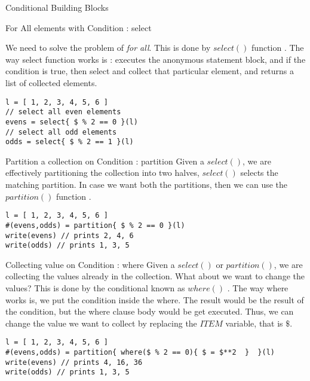 \begin{section}{Conditional Building Blocks}
\begin{subsection}{For All elements with Condition : select }

We need to solve the problem of \emph{for all}. This is done by $select()$ function .
The way select function works is : executes the anonymous statement block, and if the condition is true, 
then select and collect that particular element, and returns a list of collected elements.

\begin{lstlisting}[style=JexlStyle]
l = [ 1, 2, 3, 4, 5, 6 ]
// select all even elements 
evens = select{ $ % 2 == 0 }(l)
// select all odd elements 
odds = select{ $ % 2 == 1 }(l) 
\end{lstlisting}

\end{subsection}

\begin{subsection}{Partition a collection on Condition : partition }
Given a $select()$, we are effectively partitioning the collection into two halves,
$select()$ selects the matching partition. In case we want both the partitions, then 
we can use the $partition()$ function .

\begin{center}\begin{minipage}{\linewidth}
\begin{lstlisting}[style=JexlStyle]
l = [ 1, 2, 3, 4, 5, 6 ]
#(evens,odds) = partition{ $ % 2 == 0 }(l)
write(evens) // prints 2, 4, 6 
write(odds) // prints 1, 3, 5
\end{lstlisting}\end{minipage}
\end{center}

\end{subsection}

\begin{subsection}{Collecting value on Condition : where }
Given a $select()$ or $partition()$, we are collecting the values already 
in the collection. What about we want to change the values? 
This is done by the conditional known as $where()$ .
The way where works is, we put the condition inside the where.
The result would be the result of the condition, but the where clause body 
would be get executed. Thus, we can change the value we want to collect
by replacing the $ITEM$ variable, that is $\$$.

\begin{center}\begin{minipage}{\linewidth}
\begin{lstlisting}[style=JexlStyle]
l = [ 1, 2, 3, 4, 5, 6 ]
#(evens,odds) = partition{ where($ % 2 == 0){ $ = $**2  }  }(l)
write(evens) // prints 4, 16, 36 
write(odds) // prints 1, 3, 5
\end{lstlisting}\end{minipage}
\end{center}


\end{subsection}
\end{section}
